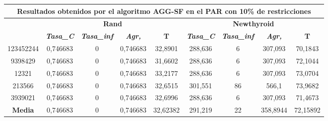 \documentclass[12pt, spanish]{article}
\begin{document}
\begin{table}[H]
\footnotesize
\begin{tabular}{|c|c|c|c|c|c|c|c|c|}
\hline
\multicolumn{9}{|c|}{\textbf{Resultados obtenidos por el algoritmo AGG-SF en el PAR con 10\% de restricciones}}                                                                                                   \\ \hline
\multirow{2}{*}{} & \multicolumn{4}{c|}{\textbf{Rand}}                                                            & \multicolumn{4}{c|}{\textbf{Newthyroid}}                                                      \\ \cline{2-9} 
                  & \textit{\textbf{Tasa\_C}} & \textit{\textbf{Tasa\_inf}} & \textit{\textbf{Agr,}} & \textbf{T} & \textit{\textbf{Tasa\_C}} & \textit{\textbf{Tasa\_inf}} & \textit{\textbf{Agr,}} & \textbf{T} \\ \hline
123452244         & 0,746683                  & 0                           & 0,746683               & 32,8901    & 288,636                   & 6                           & 307,093                & 70,1843    \\ \hline
9398429           & 0,746683                  & 0                           & 0,746683               & 31,6602    & 288,636                   & 6                           & 307,093                & 72,1044    \\ \hline
12321             & 0,746683                  & 0                           & 0,746683               & 33,2177    & 288,636                   & 6                           & 307,093                & 73,0704    \\ \hline
213566            & 0,746683                  & 0                           & 0,746683               & 32,6515    & 301,551                   & 86                          & 566,1                  & 73,9682    \\ \hline
3939021           & 0,746683                  & 0                           & 0,746683               & 32,6996    & 288,636                   & 6                           & 307,093                & 71,4673    \\ \hline
\textbf{Media}    & 0,746683                  & 0                           & 0,746683               & 32,62382   & 291,219                   & 22                          & 358,8944               & 72,15892   \\ \hline
\end{tabular}
\end{table}
\end{document}
